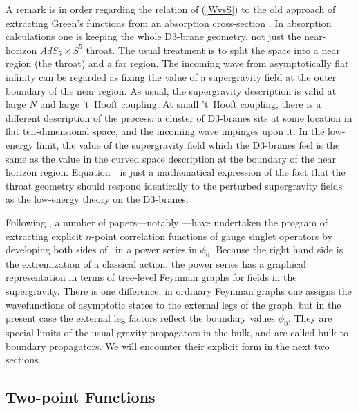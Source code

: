 A remark is in order regarding the relation of (\ref{WvsS}) to the old
approach of extracting Green's functions from an absorption cross-section
\cite{Gubser:1997se}.  In absorption calculations one is keeping the whole
D3-brane geometry, not just the near-horizon $AdS_5 \times S^5$ throat.
The usual treatment is to split the space into a near region (the throat)
and a far region.  The incoming wave from asymptotically flat infinity can
be regarded as fixing the value of a supergravity field at the outer
boundary of the near region.  As usual, the supergravity description is
valid at large $N$ and large 't~Hooft coupling.  At small 't~Hooft
coupling, there is a different description of the process: a cluster of
D3-branes sits at some location in flat ten-dimensional space, and the
incoming wave impinges upon it.  In the low-energy limit, the value of the
supergravity field which the D3-branes feel is the same as the value in the
curved space description at the boundary of the near horizon region.
Equation~\WvsS\ is just a mathematical expression of the fact that the
throat geometry should respond identically to the perturbed supergravity
fields as the low-energy theory on the D3-branes.

Following \cite{Gubser:1998bc,Witten:1998qj}, a number of papers---notably
\cite{Aref'eva:1998nn, Muck:1998rr, Freedman:1998tz, Liu:1998bu,
Chalmers:1998xr, Muck:1998iz, Solodukhin:1998ec, Lee:1998bx, Liu:1999ty,
D'Hoker:1999tz, Freedman:1998bj, D'Hoker:1998gd, Chalmers:1998wu,
Muck:1998ug, D'Hoker:1998mz, Minces:1999tp, Arutyunov:1999nw}---have 
undertaken the
program of extracting explicit $n$-point correlation functions of gauge
singlet operators by developing both sides of \WvsS\ in a power series in
$\phi_0$.  Because the right hand side is the extremization of a classical
action, the power series has a graphical representation in terms of
tree-level Feynman graphs for fields in the supergravity.  There is one
difference: in ordinary Feynman graphs one assigns the wavefunctions of
asymptotic states to the external legs of the graph, but in the present
case the external leg factors reflect the boundary values $\phi_0$.  They
are special limits of the usual gravity propagators in the bulk, and are
called bulk-to-boundary propagators.  We will encounter their explicit form
in the next two sections.

\subsection{Two-point Functions}
\label{TwoPoint}

